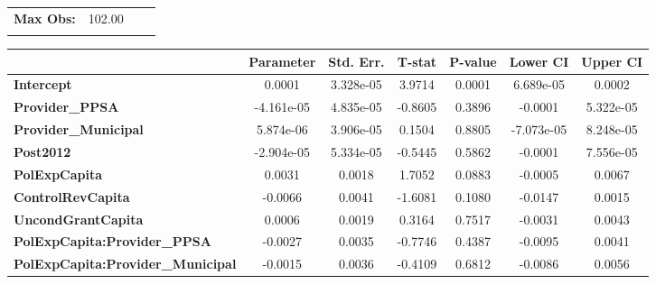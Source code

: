 \begin{center}
\begin{tabular}{lclc}
\textbf{Max Obs:}                                  &       102.00       & \textbf{                     }   &                  \\
\textbf{}                                          &                    & \textbf{                     }   &                  \\
\bottomrule
\end{tabular}
\begin{tabular}{lcccccc}
                                                   & \textbf{Parameter} & \textbf{Std. Err.} & \textbf{T-stat} & \textbf{P-value} & \textbf{Lower CI} & \textbf{Upper CI}  \\
\midrule
\textbf{Intercept}                                 &       0.0001       &     3.328e-05      &      3.9714     &      0.0001      &     6.689e-05     &       0.0002       \\
\textbf{Provider\_PPSA}                            &     -4.161e-05     &     4.835e-05      &     -0.8605     &      0.3896      &      -0.0001      &     5.322e-05      \\
\textbf{Provider\_Municipal}                       &     5.874e-06      &     3.906e-05      &      0.1504     &      0.8805      &     -7.073e-05    &     8.248e-05      \\
\textbf{Post2012}                                  &     -2.904e-05     &     5.334e-05      &     -0.5445     &      0.5862      &      -0.0001      &     7.556e-05      \\
\textbf{PolExpCapita}                              &       0.0031       &       0.0018       &      1.7052     &      0.0883      &      -0.0005      &       0.0067       \\
\textbf{ControlRevCapita}                          &      -0.0066       &       0.0041       &     -1.6081     &      0.1080      &      -0.0147      &       0.0015       \\
\textbf{UncondGrantCapita}                         &       0.0006       &       0.0019       &      0.3164     &      0.7517      &      -0.0031      &       0.0043       \\
\textbf{PolExpCapita:Provider\_PPSA}               &      -0.0027       &       0.0035       &     -0.7746     &      0.4387      &      -0.0095      &       0.0041       \\
\textbf{PolExpCapita:Provider\_Municipal}          &      -0.0015       &       0.0036       &     -0.4109     &      0.6812      &      -0.0086      &       0.0056       \\

\end{tabular}
\end{center}
